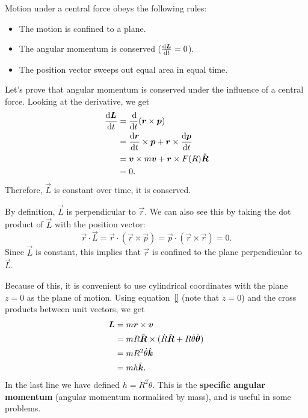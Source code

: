\documentclass[../classical_mechanics.tex]{subfiles}
\begin{document}
        Motion under a central force obeys the following rules:
        \begin{itemize}
            \item The motion is confined to a plane.
            \item The angular momentum is conserved ($\dv{\vec{L}}{t}=0$).
            \item The position vector sweeps out equal area in equal time.
        \end{itemize}
        
        Let's prove that angular momentum is conserved under the influence of a central force.
        Looking at the derivative, we get
        \begin{align}
            \dv{\vec{L}}{t}&=\dv{}{t}(\vec{r}\times\vec{p})\\
            &=\dv{\vec{r}}{t}\times\vec{p}+\vec{r}\times\dv{\vec{p}}{t}\\
            &=\vec{v}\times m\vec{v}+\vec{r}\times F(R)\uvec{R}\\
            &=0.
        \end{align}
        Therefore, $\vec{L}$ is constant over time, it is conserved.

        By definition, $\vec{L}$ is perpendicular to $\vec{r}$.
        We can also see this by taking the dot product of $\vec{L}$ with the position vector:
        \begin{equation}
            \vec{r}\cdot\vec{L}=\vec{r}\cdot(\vec{r}\times\vec{p})=\vec{p}\cdot(\vec{r}\times\vec{r})=0.
        \end{equation}
        Since $\vec{L}$ is constant, this implies that $\vec{r}$ is confined to the plane perpendicular to $\vec{L}$.
        
        Because of this, it is convenient to use cylindrical coordinates with the plane $z=0$ as the plane of motion.
        Using equation~\ref{} (note that $\dot{z}=0$) and the cross products between unit vectors, we get
        \begin{align}
            \boldsymbol{L}&=m\boldsymbol{r}\times\boldsymbol{v}\\
            &=mR\hat{\boldsymbol{R}}\times(\dot{R}\hat{\boldsymbol{R}}+R\dot{\theta}\hat{\boldsymbol{\theta}})\\
            &=mR^2\dot{\theta}\hat{\boldsymbol{k}}\label{eq:angular-momentum-theta-dot}\\
            &=mh\hat{\boldsymbol{k}}.
        \end{align}
        In the last line we have defined $h=R^2\dot{\theta}$.
        This is the \textbf{specific angular momentum} (angular momentum normalised by mass), and is useful in some problems.
\end{document}
